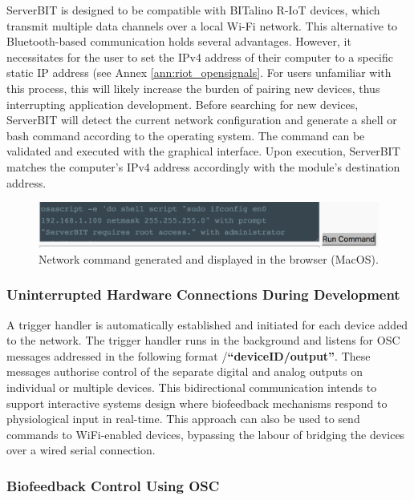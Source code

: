 ServerBIT is designed to be compatible with BITalino R-IoT devices, which transmit multiple data channels over a local Wi-Fi network. This alternative to Bluetooth-based communication holds several advantages. However, it necessitates for the user to set the IPv4 address of their computer to a specific static IP address (see Annex \ref{ann:riot_opensignals}. For users unfamiliar with this process, this will likely increase the burden of pairing new devices, thus interrupting application development. Before searching for new devices, ServerBIT will detect the current network configuration and generate a shell or bash command according to the operating system. The command can be validated and executed with the graphical interface. Upon execution, ServerBIT matches the computer's IPv4 address accordingly with the module's destination address.

\begin{figure}[htbp]
    \centering
    \includegraphics[width=\textwidth]{Chapters/Figures/technical/ServerBIT/ipv4_cmd_osx.png}
    \caption{Network command generated and displayed in the browser (MacOS).}
    \label{fig:cmd_osx}
\end{figure}

\subsubsection*{Uninterrupted Hardware Connections During Development}

A trigger handler is automatically established and initiated for each device added to the network. The trigger handler runs in the background and listens for OSC messages addressed in the following format /\textbf{``deviceID/output''}. These messages authorise control of the separate digital and analog outputs on individual or multiple devices. This bidirectional communication intends to support interactive systems design where biofeedback mechanisms respond to physiological input in real-time. This approach can also be used to send commands to WiFi-enabled devices, bypassing the labour of bridging the devices over a wired serial connection.

\subsubsection*{Biofeedback Control Using OSC} \label{Biofeedback}

